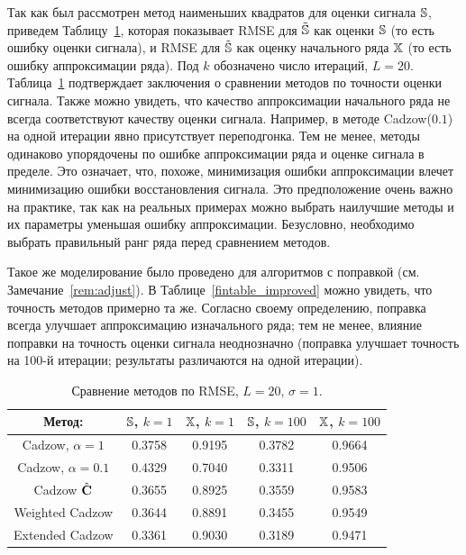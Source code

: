\documentclass[12pt, specialist, subf,href,colorlinks=true,substylefile = spbu.rtx]{disser}
\theoremstyle{remark}
\theoremstyle{definition}
\begin{document}
\smallskip
Так как был рассмотрен метод наименьших квадратов для оценки сигнала
$\mathbb{S}$, приведем Таблицу~\ref{fintable}, которая показывает RMSE для $\tilde {\mathbb{S}}$ как оценки $\mathbb{S}$ (то есть ошибку оценки сигнала), и RMSE для $\tilde {\mathbb{S}}$ как оценку начального ряда $\mathbb{X}$ (то есть ошибку аппроксимации ряда). Под $k$ обозначено число итераций, $L=20$. Таблица~\ref{fintable} подтверждает заключения о сравнении методов по точности оценки сигнала. Также можно увидеть, что качество аппроксимации начального ряда не всегда соответствуют качеству оценки сигнала. Например, в методе Cadzow($0.1$) на одной итерации явно присутствует переподгонка. Тем не менее, методы одинаково упорядочены по ошибке аппроксимации ряда и оценке сигнала в пределе. Это означает, что, похоже, минимизация ошибки аппроксимации влечет минимизацию ошибки восстановления сигнала.
Это предположение очень важно на практике, так как на реальных примерах можно выбрать наилучшие методы и их параметры уменьшая ошибку аппроксимации.
Безусловно, необходимо выбрать правильный ранг ряда перед сравнением методов.

Такое же моделирование было проведено для алгоритмов с поправкой (см. Замечание~\ref{rem:adjust}). В Таблице~\ref{fintable_improved} можно увидеть, что точность методов примерно та же. Согласно своему определению, поправка всегда улучшает аппроксимацию изначального ряда; тем не менее, влияние поправки на точность оценки сигнала неоднозначно (поправка улучшает точность на 100-й итерации; результаты различаются на одной итерации).

\begin{table}[!hhh]
	\caption{Сравнение методов по RMSE, $L = 20$, $\sigma=1$.}\label{fintable}
	\begin{center}
	    \begin{tabular}{|c|c|c|c|c|}
    		\hline
    		Метод: & $\mathbb{S}$, $k = 1$ & $\mathbb{X}$, $k = 1$ & $\mathbb{S}$, $k = 100$ & $\mathbb{X}$, $k = 100$  \\
		    \hline
		    Cadzow, $\alpha = 1$ & 0.3758 & 0.9195 & 0.3782 & 0.9664 \\
		    \hline
		    Cadzow, $\alpha = 0.1$ & 0.4329 & 0.7040 & 0.3311 & 0.9506 \\
		    \hline
		    Cadzow $\hat{\mathbf{C}}$ & 0.3655 & 0.8925 & 0.3559 & 0.9583 \\
		    \hline
		    Weighted Cadzow & 0.3644 & 0.8891 & 0.3455 & 0.9549 \\
		    \hline
		    Extended Cadzow & 0.3361 & 0.9030 & 0.3189 & 0.9471 \\
		    \hline
	    \end{tabular}
	\end{center}
\end{table}
\end{document}
